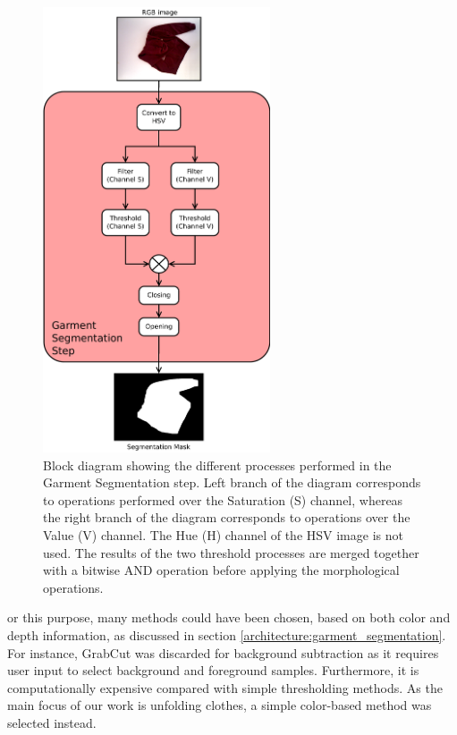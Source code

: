 \begin{figure}[thpb]
    \centering
    \includegraphics[width=0.6\textwidth]
    {figures/Garment-segmentation-process-diagram.pdf}
    \caption{Block diagram showing the different processes performed in the Garment Segmentation step. Left branch of the diagram corresponds to operations performed over the Saturation (S) channel, whereas the right branch of the diagram corresponds to operations over the Value (V) channel. The Hue (H) channel of the HSV image is not used. The results of the two threshold processes are merged together with a bitwise AND operation before applying the morphological operations.}
    \label{fig:background_subtration_processes}
\end{figure}
or this purpose, many methods could have been chosen, based on both color and depth information, as discussed in section \ref{architecture:garment_segmentation}. For instance, GrabCut  was discarded for background subtraction as it requires user input to select background and foreground samples. Furthermore, it is computationally expensive compared with simple thresholding methods. As the main focus of our work is unfolding clothes, a simple color-based method was selected instead. 


